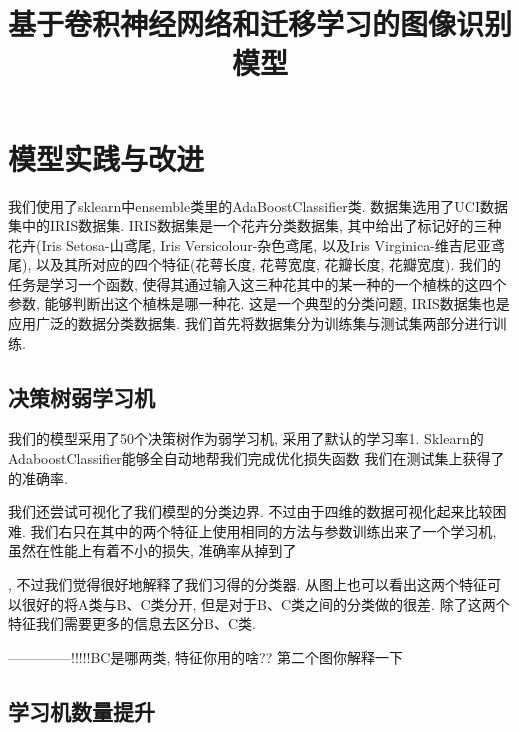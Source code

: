 \documentclass[lang=cn,11pt]{elegantpaper}
\title{基于卷积神经网络和迁移学习的图像识别模型}
\date{}
\begin{document}
\newpage
\maketitle

\vspace{-25pt}
\begin{abstract}



\end{abstract}
\keywords{}
	
\tableofcontents
\thispagestyle{empty}
\newpage
\normalsize
{}


\section{模型实践与改进}

我们使用了sklearn中ensemble类里的AdaBoostClassifier类. 数据集选用了UCI数据集中的IRIS数据集. IRIS数据集是一个花卉分类数据集, 其中给出了标记好的三种花卉(Iris Setosa-山鸢尾, Iris Versicolour-杂色鸢尾, 以及Iris Virginica-维吉尼亚鸢尾), 以及其所对应的四个特征(花萼长度, 花萼宽度, 花瓣长度, 花瓣宽度). 我们的任务是学习一个函数, 使得其通过输入这三种花其中的某一种的一个植株的这四个参数, 能够判断出这个植株是哪一种花. 这是一个典型的分类问题, IRIS数据集也是应用广泛的数据分类数据集. 我们首先将数据集分为训练集与测试集两部分进行训练.

\subsection{决策树弱学习机}

我们的模型采用了50个决策树作为弱学习机, 采用了默认的学习率1. Sklearn的AdaboostClassifier能够全自动地帮我们完成优化损失函数%
我们在测试集上获得了
的准确率. 


我们还尝试可视化了我们模型的分类边界. 不过由于四维的数据可视化起来比较困难. 我们右只在其中的两个特征上使用相同的方法与参数训练出来了一个学习机, 虽然在性能上有着不小的损失, 准确率从掉到了

, 不过我们觉得很好地解释了我们习得的分类器. 从图上也可以看出这两个特征可以很好的将A类与B、C类分开, 但是对于B、C类之间的分类做的很差. 除了这两个特征我们需要更多的信息去区分B、C类. 

--------------!!!!!BC是哪两类, 特征你用的啥?? 第二个图你解释一下


\subsection{学习机数量提升}
\end{document}
